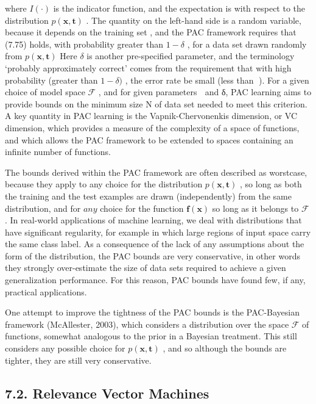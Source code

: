 \documentclass[
  10
]{article}
\begin{document}
where \(I ( \cdot )\) is the indicator function, and the expectation is
with respect to the distribution \(p ( \mathbf { x } , \mathbf { t } )\)
. The quantity on the left-hand side is a random variable, because it
depends on the training set , and the PAC framework requires that (7.75)
holds, with probability greater than \(1 - \delta\) , for a data set
drawn randomly from \(p ( \mathbf { x } , \mathbf { t } )\) Here
\(\delta\) is another pre-specified parameter, and the terminology
`probably approximately correct' comes from the requirement that with
high probability (greater than \(1 - \delta )\) , the error rate be
small (less than ). For a given choice of model space \(\mathcal { F }\)
, and for given parameters  and δ, PAC learning aims to provide bounds
on the minimum size N of data set needed to meet this criterion. A key
quantity in PAC learning is the Vapnik-Chervonenkis dimension, or VC
dimension, which provides a measure of the complexity of a space of
functions, and which allows the PAC framework to be extended to spaces
containing an infinite number of functions.

The bounds derived within the PAC framework are often described as
worstcase, because they apply to any choice for the distribution
\(p ( \mathbf { x } , \mathbf { t } )\) , so long as both the training
and the test examples are drawn (independently) from the same
distribution, and for \(a n y\) choice for the function
\(\mathbf { f } \left( \mathbf { x } \right)\) so long as it belongs to
\(\mathcal { F }\) . In real-world applications of machine learning, we
deal with distributions that have significant regularity, for example in
which large regions of input space carry the same class label. As a
consequence of the lack of any assumptions about the form of the
distribution, the PAC bounds are very conservative, in other words they
strongly over-estimate the size of data sets required to achieve a given
generalization performance. For this reason, PAC bounds have found few,
if any, practical applications.

One attempt to improve the tightness of the PAC bounds is the
PAC-Bayesian framework (McAllester, 2003), which considers a
distribution over the space \(\mathcal { F }\) of functions, somewhat
analogous to the prior in a Bayesian treatment. This still considers any
possible choice for \(p ( \mathbf { x } , \mathbf { t } )\) , and so
although the bounds are tighter, they are still very conservative.

\subsection{7.2. Relevance Vector
Machines}\label{relevance-vector-machines}
\end{document}
